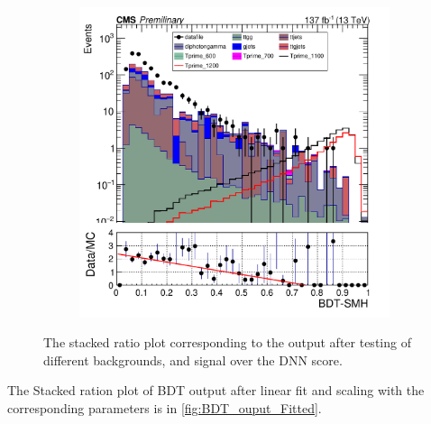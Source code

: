 \begin{figure}[H]
\begin{subfigure}[b]{0.3\textwidth}
         \label{fig:three sin x}
     \end{subfigure}
     \hfill
     \begin{subfigure}[b]{0.3\textwidth}
         \centering
         \includegraphics[width=\textwidth]{BDT_Output/Stacked_plot_BDT_1100-1200_with_diphoton_cuts_inputs.pdf}
         \label{fig:three sin x}
     \end{subfigure}
     \label{fig:BDT_output_11}
     \caption{The stacked ratio plot corresponding to the output after testing of different backgrounds, and signal over the DNN score.}
\end{figure}


The Stacked ration plot of BDT output after linear fit and scaling with the corresponding parameters is in \autoref{fig:BDT_ouput_Fitted}.



